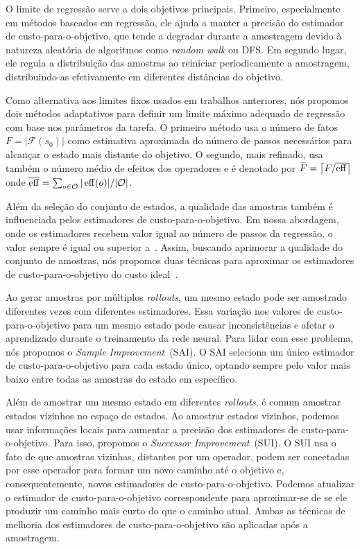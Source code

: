 O limite de regressão serve a dois objetivos principais. Primeiro, especialmente em métodos baseados em regressão, ele ajuda a manter a precisão do estimador de custo-para-o-objetivo, que tende a degradar durante a amostragem devido à natureza aleatória de algoritmos como \textit{random walk} ou DFS. Em segundo lugar, ele regula a distribuição das amostras ao reiniciar periodicamente a amostragem, distribuindo-as efetivamente em diferentes distâncias do objetivo.

Como alternativa aos limites fixos usados em trabalhos anteriores, nós propomos dois métodos adaptativos para definir um limite máximo adequado de regressão com base nos parâmetros da tarefa. O primeiro método usa o número de fatos~$F = |\mathcal{F}(s_0)|$ como estimativa aproximada do número de passos necessários para alcançar o estado mais distante do objetivo. O segundo, mais refinado, usa também o número médio de efeitos dos operadores e é denotado por $\bar F=\left\lceil F/\overline{\operatorname{eff}}\right\rceil$ onde $\overline{\operatorname{eff}}=\sum_{o\in \mathcal{O}} |\operatorname{eff}(o)|/|\mathcal{O}|$.

Além da seleção do conjunto de estados, a qualidade das amostras também é influenciada pelos estimadores de custo-para-o-objetivo. Em nossa abordagem, onde os estimadores recebem valor igual ao número de passos da regressão, o valor sempre é igual ou superior a~\hstar. Assim, buscando aprimorar a qualidade do conjunto de amostras, nós propomos duas técnicas para aproximar os estimadores de custo-para-o-objetivo do custo ideal~\hstar.

Ao gerar amostras por múltiplos \textit{rollouts}, um mesmo estado pode ser amostrado diferentes vezes com diferentes estimadores. Essa variação nos valores de custo-para-o-objetivo para um mesmo estado pode causar inconsistências e afetar o aprendizado durante o treinamento da rede neural. Para lidar com esse problema, nós propomos o \textit{Sample Improvement}~(SAI). O SAI seleciona um único estimador de custo-para-o-objetivo para cada estado único, optando sempre pelo valor mais baixo entre todas as amostras do estado em específico.

Além de amostrar um mesmo estado em diferentes \textit{rollouts}, é comum amostrar estados vizinhos no espaço de estados. Ao amostrar estados vizinhos, podemos usar informações locais para aumentar a precisão dos estimadores de custo-para-o-objetivo. Para isso, propomos o \textit{Successor Improvement}~(SUI). O SUI usa o fato de que amostras vizinhas, distantes por um operador, podem ser conectadas por esse operador para formar um novo caminho até o objetivo e, consequentemente, novos estimadores de custo-para-o-objetivo. Podemos atualizar o estimador de custo-para-o-objetivo correspondente para aproximar-se de \hstar se ele produzir um caminho mais curto do que o caminho atual. Ambas as técnicas de melhoria dos estimadores de custo-para-o-objetivo são aplicadas após a amostragem.

